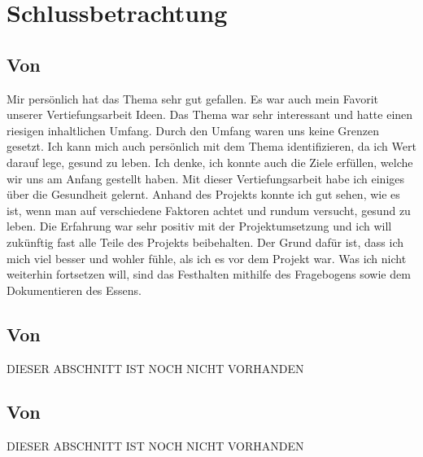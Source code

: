 \chapter{Schlussbetrachtung}
\section{Von \bastian}
\authortoc{\bastian}{\sectionident}
Mir persönlich hat das Thema sehr gut gefallen. Es war auch mein Favorit unserer Vertiefungsarbeit Ideen. Das Thema war sehr interessant und hatte einen riesigen inhaltlichen Umfang. Durch den Umfang waren uns keine Grenzen gesetzt. Ich kann mich auch persönlich mit dem Thema identifizieren, da ich Wert darauf lege, gesund zu leben. Ich denke, ich konnte auch die Ziele erfüllen, welche wir uns am Anfang gestellt haben. Mit dieser Vertiefungsarbeit habe ich einiges über die Gesundheit gelernt. Anhand des Projekts konnte ich gut sehen, wie es ist, wenn man auf verschiedene Faktoren achtet und rundum versucht, gesund zu leben. Die Erfahrung war sehr positiv mit der Projektumsetzung und ich will zukünftig fast alle Teile des Projekts beibehalten. Der Grund dafür ist, dass ich mich viel besser und wohler fühle, als ich es vor dem Projekt war. Was ich nicht weiterhin fortsetzen will, sind das Festhalten mithilfe des Fragebogens sowie dem Dokumentieren des Essens. 
\section{Von \dario}
\authortoc{\dario}{\sectionident}
DIESER ABSCHNITT IST NOCH NICHT VORHANDEN
\newline
\newline
\lipsum[4-8][32-64]
\section{Von \jonas}
\authortoc{\jonas}{\sectionident}
DIESER ABSCHNITT IST NOCH NICHT VORHANDEN
\newline
\newline
\lipsum[4-8][32-64]